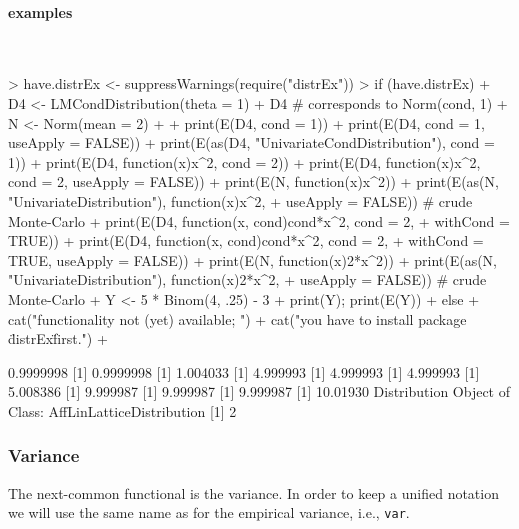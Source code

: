 \documentclass[11pt]{article}
\newcommand{\code}[1]{{\tt #1}}
\begin{document}
\paragraph{examples} $ \mbox{ }$\newline
\begin{Schunk}
\begin{Sinput}
> have.distrEx <- suppressWarnings(require("distrEx"))
> if (have.distrEx)
+     {D4 <- LMCondDistribution(theta = 1)
+      D4  # corresponds to Norm(cond, 1)
+      N <- Norm(mean = 2)
+
+      print(E(D4, cond = 1))
+      print(E(D4, cond = 1, useApply = FALSE))
+      print(E(as(D4, "UnivariateCondDistribution"), cond = 1))
+      print(E(D4, function(x){x^2}, cond = 2))
+      print(E(D4, function(x){x^2}, cond = 2, useApply = FALSE))
+      print(E(N, function(x){x^2}))
+      print(E(as(N, "UnivariateDistribution"), function(x){x^2},
+        useApply = FALSE)) # crude Monte-Carlo
+      print(E(D4, function(x, cond){cond*x^2}, cond = 2,
+        withCond = TRUE))
+      print(E(D4, function(x, cond){cond*x^2}, cond = 2,
+        withCond = TRUE, useApply = FALSE))
+      print(E(N, function(x){2*x^2}))
+      print(E(as(N, "UnivariateDistribution"), function(x){2*x^2},
+        useApply = FALSE)) # crude Monte-Carlo
+      Y <- 5 * Binom(4, .25) - 3
+      print(Y); print(E(Y))
+     } else {
+     cat("\n functionality not (yet) available; ")
+     cat("you have to install package \"distrEx\" first.\n")
+     }
\end{Sinput}
\begin{Soutput}
[1] 0.9999998
[1] 0.9999998
[1] 1.004033
[1] 4.999993
[1] 4.999993
[1] 4.999993
[1] 5.008386
[1] 9.999987
[1] 9.999987
[1] 9.999987
[1] 10.01930
Distribution Object of Class: AffLinLatticeDistribution
[1] 2
\end{Soutput}
\end{Schunk}
%
%
\subsubsection{Variance}
The next-common functional is the variance. In order to keep a unified
notation we will use the same name as for the empirical variance, i.e.,
 \code{var}.
\end{document}
